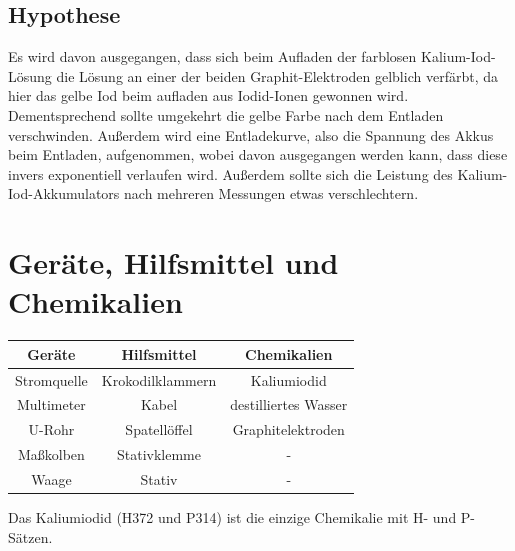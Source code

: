 \documentclass[11pt]{article}
\begin{document}
\subsection{Hypothese}
Es wird davon ausgegangen, dass sich beim Aufladen der farblosen Kalium-Iod-Lösung die Lösung an einer der beiden Graphit-Elektroden gelblich verfärbt, da hier das gelbe Iod beim aufladen aus Iodid-Ionen gewonnen wird. Dementsprechend sollte umgekehrt die gelbe Farbe nach dem Entladen verschwinden. Außerdem wird eine Entladekurve, also die Spannung des Akkus beim Entladen, aufgenommen, wobei davon ausgegangen werden kann, dass diese invers exponentiell verlaufen wird. Außerdem sollte sich die Leistung des Kalium-Iod-Akkumulators nach mehreren Messungen etwas verschlechtern. 

\section{Geräte, Hilfsmittel und Chemikalien}
\begin{center}

    \begin{tabular}{ c|c|c } 
        Geräte & Hilfsmittel & Chemikalien \\ 
        \hline
        Stromquelle & Krokodilklammern & Kaliumiodid \\ 
        Multimeter & Kabel & destilliertes Wasser \\
        U-Rohr & Spatellöffel & Graphitelektroden \\
        Maßkolben & Stativklemme & - \\
        Waage & Stativ & - \\ 
       \end{tabular}

\end{center}
\noindent
Das Kaliumiodid (H372 und P314) ist die einzige Chemikalie mit H- und P-Sätzen.
\end{document}
